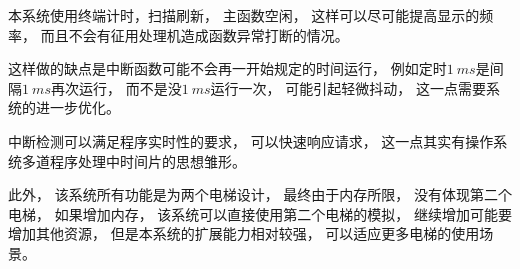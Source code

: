\documentclass[../main.tex]{subfiles} %
\begin{document}
本系统使用终端计时，扫描刷新，
主函数空闲，
这样可以尽可能提高显示的频率，
而且不会有征用处理机造成函数异常打断的情况。

这样做的缺点是中断函数可能不会再一开始规定的时间运行，
例如定时$\SI{1}{ms}$是间隔$\SI{1}{ms}$再次运行，
而不是没$\SI{1}{ms}$运行一次，
可能引起轻微抖动，
这一点需要系统的进一步优化。

中断检测可以满足程序实时性的要求，
可以快速响应请求，
这一点其实有操作系统多道程序处理中时间片的思想雏形。

此外，
该系统所有功能是为两个电梯设计，
最终由于内存所限，
没有体现第二个电梯，
如果增加内存，
该系统可以直接使用第二个电梯的模拟，
继续增加可能要增加其他资源，
但是本系统的扩展能力相对较强，
可以适应更多电梯的使用场景。
\end{document}
